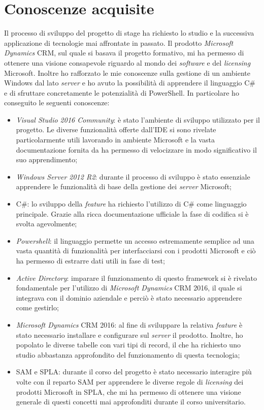 \section{Conoscenze acquisite}
Il processo di sviluppo del progetto di stage ha richiesto lo studio e la successiva applicazione di tecnologie mai affrontate in passato.
Il prodotto \emph{Microsoft Dynamics} CRM, sul quale si basava il progetto formativo, mi ha permesso di ottenere una visione consapevole riguardo al mondo dei \emph{software} e del \emph{licensing} Microsoft. 
Inoltre ho rafforzato le mie conoscenze sulla gestione di un ambiente Windows dal lato \emph{server} e ho avuto la possibilità di apprendere il linguaggio C\# e di sfruttare concretamente le potenzialità di PowerShell.
In particolare ho conseguito le seguenti conoscenze:
\begin{itemize}
    \item \emph{Visual Studio 2016 Community}: è stato l’ambiente di sviluppo utilizzato per il progetto. Le diverse funzionalità offerte dall’IDE si sono rivelate particolarmente utili lavorando in ambiente Microsoft e la vasta documentazione fornita da  ha permesso di velocizzare in modo significativo il suo apprendimento;
    \item \emph{Windows Server 2012 R2}: durante il processo di sviluppo è stato essenziale apprendere le funzionalità di base della gestione dei \emph{server} Microsoft;
    \item C\#: lo sviluppo della \emph{feature} ha richiesto l’utilizzo di C\# come linguaggio principale.
    Grazie alla ricca documentazione ufficiale la fase di codifica si è svolta agevolmente;
    \item \emph{Powershell}: il linguaggio  permette un accesso estremamente semplice ad una vasta quantità di funzionalità per interfacciarsi con i prodotti Microsoft e ciò ha permesso di estrarre dati utili in fase di test;
    \item \emph{Active Directory}: imparare il funzionamento di questo framework si è rivelato fondamentale per l’utilizzo di \emph{Microsoft Dynamics} CRM 2016, il quale si integrava con il dominio aziendale e perciò è stato necessario apprendere come gestirlo;
    \item \emph{Microsoft Dynamics} CRM 2016: al fine di sviluppare la relativa \emph{feature} è stato necessario installare e configurare sul \emph{server} il prodotto. Inoltre, ho popolato le diverse tabelle con vari tipi di record, il che ha richiesto uno studio abbastanza approfondito del
    funzionamento di questa tecnologia;
    \item SAM e SPLA: durante il corso del progetto è stato necessario interagire più volte con il reparto SAM per apprendere le diverse regole di \emph{licensing} dei prodotti Microsoft in SPLA, che mi ha permesso di ottenere una visione generale di questi concetti mai approfonditi durante il corso universitario.
\end{itemize}